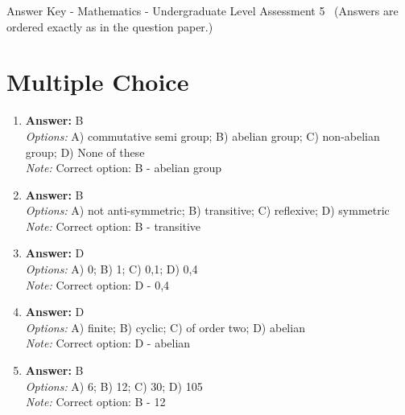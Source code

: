 \documentclass[12pt]{article}
\begin{document}
\begin{center}
Answer Key - Mathematics - Undergraduate Level Assessment 5 \
\small (Answers are ordered exactly as in the question paper.)
\end{center}

\section*{Multiple Choice}
\begin{enumerate}[label=\arabic*.]
\item \textbf{Answer:} B
\\ \textit{Options:} A) commutative semi group; B) abelian group; C) non-abelian group; D) None of these
\\ \textit{Note:} Correct option: B - abelian group
\item \textbf{Answer:} B
\\ \textit{Options:} A) not anti-symmetric; B) transitive; C) reflexive; D) symmetric
\\ \textit{Note:} Correct option: B - transitive
\item \textbf{Answer:} D
\\ \textit{Options:} A) 0; B) 1; C) 0,1; D) 0,4
\\ \textit{Note:} Correct option: D - 0,4
\item \textbf{Answer:} D
\\ \textit{Options:} A) finite; B) cyclic; C) of order two; D) abelian
\\ \textit{Note:} Correct option: D - abelian
\item \textbf{Answer:} B
\\ \textit{Options:} A) 6; B) 12; C) 30; D) 105
\\ \textit{Note:} Correct option: B - 12
\end{enumerate}
\end{document}
